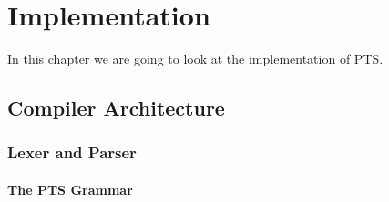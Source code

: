 
\chapter{Implementation}\label{ch:implementation}

In this chapter we are going to look at the implementation of PTS.

\section{Compiler Architecture}\label{sec:architecture}



\subsection{Lexer and Parser}\label{subsec:lexer-and-parser}

\subsubsection{The PTS Grammar}

